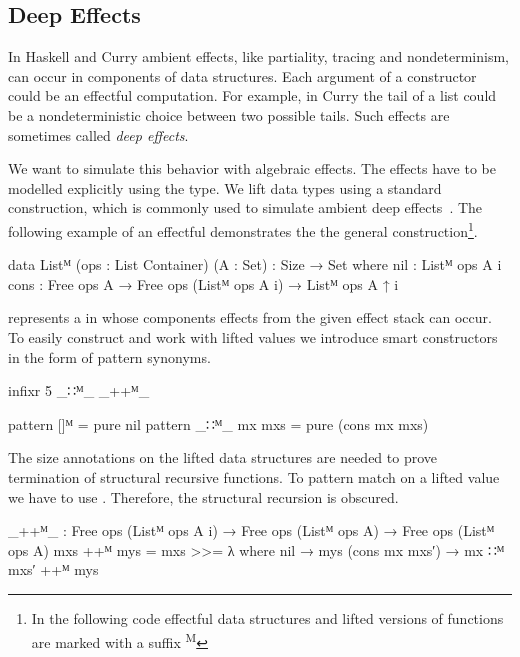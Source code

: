 \subsection{Deep Effects}
\label{first-order:deep-effects}

In Haskell and Curry ambient effects, like partiality, tracing and
nondeterminism, can occur in components of data structures.
Each argument of a constructor could be an effectful computation.
For example, in Curry the tail of a list could be a nondeterministic choice
between two possible tails.
Such effects are sometimes called \textit{deep effects}.

We want to simulate this behavior with algebraic effects.
The effects have to be modelled explicitly using the  type.
We lift data types using a standard construction, which is commonly used
to simulate ambient deep
effects~\cite{DBLP:conf/haskell/AbelBBHN05, DBLP:journals/programming/DylusCT19,
DBLP:conf/haskell/ChristiansenDB19}.
The following example of an effectful  demonstrates the
the general construction\footnote{In the following code effectful data
  structures and lifted versions of functions are marked with a suffix
  \textsuperscript{M}}.

\begin{code}
data Listᴹ (ops : List Container) (A : Set) : {Size} → Set where
  nil   : Listᴹ ops A {i}
  cons  : Free ops A → Free ops (Listᴹ ops A {i}) → Listᴹ ops A {↑ i}
\end{code}
\AgdaSpace{}\AgdaSpace{}
represents a \AgdaSpace{} in whose components
effects from the given effect stack  can occur.
To easily construct and work with lifted values we introduce smart constructors
in the form of pattern synonyms.

\begin{code}[hide]
infixr 5 _∷ᴹ_ _++ᴹ_
\end{code}
\begin{code}
pattern []ᴹ          = pure nil
pattern _∷ᴹ_ mx mxs  = pure (cons mx mxs)
\end{code}
The size annotations on the lifted data structures are needed to prove
termination of structural recursive functions.
To pattern match on a lifted value we have to use \AgdaFunction{>>=}.
Therefore, the structural recursion is obscured.

\begin{code}
_++ᴹ_ : Free ops (Listᴹ ops A {i}) → Free ops (Listᴹ ops A) → Free ops (Listᴹ ops A)
mxs ++ᴹ mys = mxs >>= λ where
  nil             → mys
  (cons mx mxs′)  → mx ∷ᴹ mxs′ ++ᴹ mys
\end{code}


